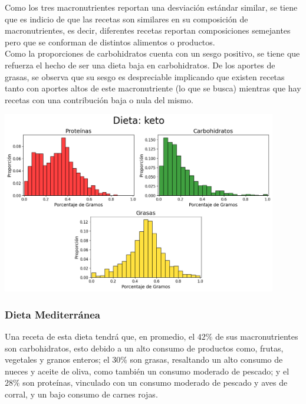 \documentclass[12pt,a4paper]{article}
\begin{document}
            Como los tres macronutrientes reportan una desviación estándar similar, 
            se tiene que es indicio de que las recetas son similares en su composición 
            de macronutrientes, es decir, diferentes recetas reportan composiciones 
            semejantes pero que se conforman de distintos alimentos o productos.\\

            Como la proporciones de carbohidratos cuenta con un sesgo positivo, se 
            tiene que refuerza el hecho de ser una dieta baja en carbohidratos. 
            De los aportes de grasas, se observa que su sesgo es despreciable implicando 
            que existen recetas tanto con aportes altos de este macronutriente (lo que se 
            busca) mientras que hay recetas con una contribución baja o nula del mismo.
            
            \begin{center}
                \includegraphics[width=0.90\textwidth]{Resources/2_03_plot_02.png}
            \end{center}

        \subsubsection{Dieta Mediterránea}

            Una receta de esta dieta tendrá que, en promedio, el $42\%$ de sus 
            macronutrientes son carbohidratos, esto debido a un alto consumo de 
            productos como, frutas, vegetales y granos enteros; el $30\%$ son 
            grasas, resaltando un alto consumo de nueces y aceite de oliva, como 
            también un consumo moderado de pescado; y el $28\%$ son proteínas, 
            vinculado con un consumo moderado de pescado y aves de corral, y un 
            bajo consumo de carnes rojas.\\
\end{document}
